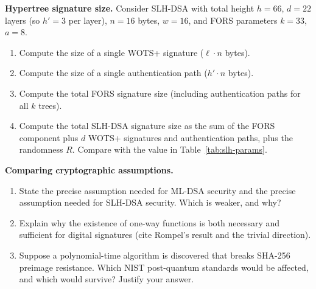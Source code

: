 \begin{prob}
\label{prob:ch10-hypertree}
\textbf{Hypertree signature size.}  Consider SLH-DSA with total height $h = 66$, $d = 22$ layers (so $h' = 3$ per layer), $n = 16$ bytes, $w = 16$, and FORS parameters $k = 33$, $a = 8$.
\begin{enumerate}
\item[(a)] Compute the size of a single WOTS+ signature ($\ell \cdot n$ bytes).
\item[(b)] Compute the size of a single authentication path ($h' \cdot n$ bytes).
\item[(c)] Compute the total FORS signature size (including authentication paths for all $k$ trees).
\item[(d)] Compute the total SLH-DSA signature size as the sum of the FORS component plus $d$ WOTS+ signatures and authentication paths, plus the randomness $R$.  Compare with the value in Table~\ref{tab:slh-params}.
\end{enumerate}
\end{prob}

\begin{prob}
\label{prob:ch10-assumptions}
\textbf{Comparing cryptographic assumptions.}
\begin{enumerate}
\item[(a)] State the precise assumption needed for ML-DSA security and the precise assumption needed for SLH-DSA security.  Which is weaker, and why?
\item[(b)] Explain why the existence of one-way functions is both necessary and sufficient for digital signatures (cite Rompel's result and the trivial direction).
\item[(c)] Suppose a polynomial-time algorithm is discovered that breaks SHA-256 preimage resistance.  Which NIST post-quantum standards would be affected, and which would survive?  Justify your answer.
\end{enumerate}
\end{prob}
